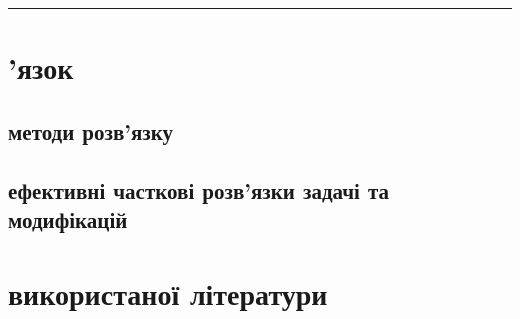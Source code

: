 \documentclass[14pt]{article}
\begin{document}
\begin{spacing}{1.175}
    \hspace{15cm} \rule{0.7em}{0.7em}
    


    
    
    
    
        
        

    \section{'язок}
        \subsection{ методи розв'язку}
        \subsection{ ефективні часткові розв'язки задачі та модифікацій}

    \section{ використаної літератури}

    \newpage
    

    




    
	\end{spacing}
\end{document}
